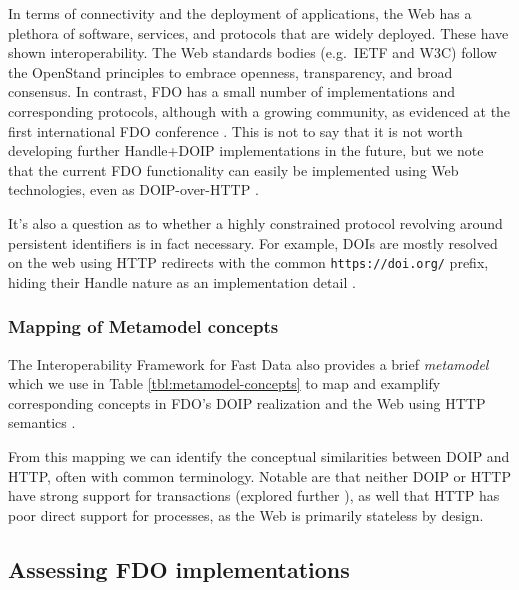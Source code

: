 \documentclass[fleqn,10pt,NOlineno]{wlpeerjlua}
\begin{document}
In terms of connectivity and the deployment of applications, the Web has a plethora of software, services, and protocols that are widely deployed. These have shown interoperability. The Web standards bodies (e.g.~IETF and W3C) follow the OpenStand principles \autocite{ModernStandardsParadigm} to embrace openness, transparency, and broad consensus. In contrast, FDO has a small number of implementations and corresponding protocols, although with a growing community, as evidenced at the first international FDO conference \autocite{looFirstInternationalConference2022}. This is not to say that it is not worth developing further Handle+DOIP implementations in the future, but we note that the current FDO functionality can easily be implemented using Web technologies, even as DOIP-over-HTTP \autocite{DOIPAPIHTTPa}.

It's also a question as to whether a highly constrained protocol revolving around persistent identifiers is in fact necessary. For example, DOIs are mostly resolved on the web \autocite{DOIResolutionDocumentation} using HTTP redirects with the common \texttt{https://doi.org/} prefix, hiding their Handle nature as an implementation detail \autocite{DOIHandbookResolution}.



\subsubsection*{Mapping of Metamodel concepts}\label{mapping-of-metamodel-concepts}

The Interoperability Framework for Fast Data also provides a brief \emph{metamodel} which we use in Table \vref{tbl:metamodel-concepts} to map and examplify corresponding concepts in FDO's DOIP realization and the Web using HTTP semantics \autocite{rfc9110}.

From this mapping we can identify the conceptual similarities between DOIP and HTTP, often with common terminology. Notable are that neither DOIP or HTTP have strong support for transactions (explored further ), as well that HTTP has poor direct support for processes, as the Web is primarily stateless by design.



\subsection*{Assessing FDO implementations}\label{sec:doip-fdo-compare}
\end{document}
